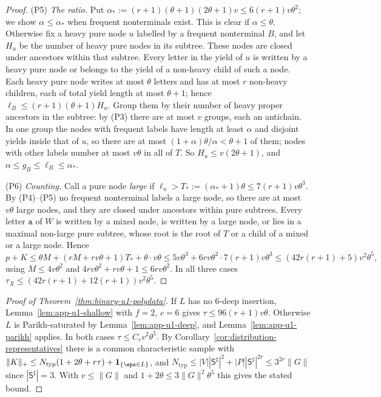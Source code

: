 \begin{proof}
(P5) \emph{The ratio.}  Put $\alpha_*:=(r+1)(\theta+1)(2\theta+1)v\le6(r+1)v\theta^2$;
we show $\alpha\le\alpha_*$ when frequent nonterminals exist.  This is clear if
$\alpha\le\theta$.  Otherwise fix a heavy pure node $u$ labelled by a
frequent nonterminal $B$, and let $H_u$ be the number of heavy pure nodes in
its subtree.  These nodes are closed under ancestors within that subtree.
Every letter in the yield of $u$ is written by a heavy pure node or belongs
to the yield of a non-heavy child of such a node.  Each heavy pure node writes
at most $\theta$ letters and has at most $r$ non-heavy children, each of total
yield length at most $\theta+1$; hence
$\ell_B\le(r+1)(\theta+1)H_u$.  Group them by their number of heavy proper
ancestors in the subtree: by (P3) there are at most $v$ groups, each an
antichain.  In one group the nodes with frequent labels have length at least
$\alpha$ and disjoint yields inside that of $u$, so there are at most
$(1+\alpha)\theta/\alpha<\theta+1$ of them; nodes with other labels number at
most $v\theta$ in all of $T$.  So $H_u\le v(2\theta+1)$, and
$\alpha\le g_B\le\ell_B\le\alpha_*$.

(P6) \emph{Counting.}  Call a pure node \emph{large} if $\ell_u>T_*:=(\alpha_*+1)\theta
\le7(r+1)v\theta^3$.  By (P4)--(P5) no frequent nonterminal labels a large node,
so there are at most $v\theta$ large nodes, and they are closed under ancestors
within pure subtrees.  Every letter $\mathtt a$ of $W$ is written by a mixed node, is
written by a large node, or lies in a maximal non-large pure subtree, whose root
is the root of $T$ or a child of a mixed or a large node.  Hence
\[
 p+K\le\theta M+(rM+rv\theta+1)T_*+\theta\cdot v\theta
 \le5v\theta^3+6rv\theta^2\cdot7(r+1)v\theta^3\le(42r(r+1)+5)v^2\theta^5,
\]
using $M\le4v\theta^2$ and $4rv\theta^2+rv\theta+1\le6rv\theta^2$.  In all three
cases $\tau_X\le(42r(r+1)+12(r+1))v^2\theta^5$.
\end{proof}

\begin{proof}[Proof of Theorem~\ref{thm:binary-u1-polydata}]
If $L$ has no $6$-deep insertion, Lemma~\ref{lem:app-u1-shallow} with $f=2$,
$c=6$ gives $\tau\le96(r+1)v\theta$.  Otherwise $L$ is Parikh-saturated by
Lemma~\ref{lem:app-u1-deep}, and Lemma~\ref{lem:app-u1-parikh} applies.  In both
cases $\tau\le C_rv^2\theta^5$.  By Corollary~\ref{cor:distribution-representatives}
there is a common characteristic sample with
$\|K\|_+\le N_{\mathrm{typ}}(1+2\theta+r\tau)+\mathbf 1_{\{\eps\in L\}}$, and
$N_{\mathrm{typ}}\le|V||\mathsf S^\sharp|^2+|P||\mathsf S^\sharp|^{2r}\le3^{2r}\|G\|$ since
$|\mathsf S^\sharp|=3$.  With $v\le\|G\|$ and $1+2\theta\le3\|G\|^2\theta^5$ this gives
the stated bound.
\end{proof}

